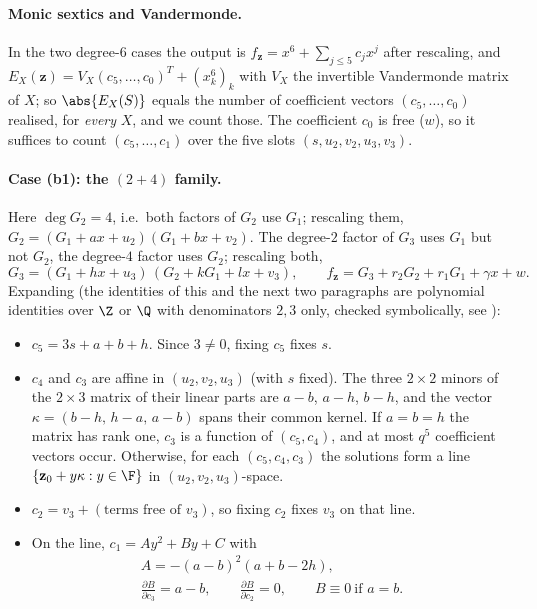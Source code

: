 \paragraph{Monic sextics and Vandermonde.}
In the two degree-$6$ cases the output is $f_{\mathbf z}=x^6+\sum_{j\le5}c_jx^j$ after
rescaling, and $E_X(\mathbf z)=V_X(c_5,\dots,c_0)^{T}+(x_k^6)_k$ with $V_X$ the
invertible Vandermonde matrix of $X$; so $\abs{E_X(S)}$ equals the number of coefficient
vectors $(c_5,\dots,c_0)$ realised, for \emph{every} $X$, and we count those.  The
coefficient $c_0$ is free ($w$), so it suffices to count $(c_5,\dots,c_1)$ over the five
slots $(s,u_2,v_2,u_3,v_3)$.

\paragraph{Case (b1): the $(2{+}4)$ family.}
Here $\deg G_2=4$, i.e.\ both factors of $G_2$ use $G_1$; rescaling them,
$G_2=(G_1+ax+u_2)(G_1+bx+v_2)$.  The degree-$2$ factor of $G_3$ uses $G_1$ but not
$G_2$, the degree-$4$ factor uses $G_2$; rescaling both,
\[
   G_3=(G_1+hx+u_3)\,(G_2+kG_1+lx+v_3),\qquad
   f_{\mathbf z}=G_3+r_2G_2+r_1G_1+\gamma x+w .
\]
Expanding (the identities of this and the next two paragraphs are polynomial identities
over $\Z$ or $\Q$ with denominators $2,3$ only, checked symbolically, see
):
\begin{itemize}
\item $c_5=3s+a+b+h$.  Since $3\neq0$, fixing $c_5$ fixes $s$.
\item $c_4$ and $c_3$ are affine in $(u_2,v_2,u_3)$ (with $s$ fixed).  The three $2\times2$
   minors of the $2\times3$ matrix of their linear parts are $a-b$, $a-h$, $b-h$, and the
   vector $\kappa=(b-h,\,h-a,\,a-b)$ spans their common kernel.  If $a=b=h$ the matrix
   has rank one, $c_3$ is a function of $(c_5,c_4)$, and at most $q^5$ coefficient vectors
   occur.  Otherwise, for each $(c_5,c_4,c_3)$ the solutions form a line
   $\{\mathbf z_0+y\kappa: y\in\F\}$ in $(u_2,v_2,u_3)$-space.
\item $c_2=v_3+(\text{terms free of }v_3)$, so fixing $c_2$ fixes $v_3$ on that line.
\item On the line, $c_1=Ay^2+By+C$ with
   \begin{gather*}
      A=-(a-b)^2(a+b-2h),\\
      \frac{\partial B}{\partial c_3}=a-b,\qquad
      \frac{\partial B}{\partial c_2}=0,\qquad
      B\equiv0\ \text{if }a=b .
   \end{gather*}
\end{itemize}
